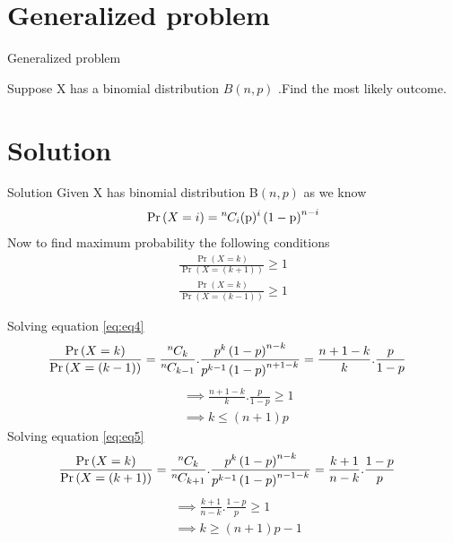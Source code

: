 \documentclass{beamer}
\providecommand{\pr}[1]{\ensuremath{\Pr\left(#1\right)}}
\providecommand{\brak}[1]{\ensuremath{\left(#1\right)}}
\newcommand*{\permcomb}[4][0mu]{{{}^{#3}\mkern#1#2_{#4}}}
\newcommand*{\comb}[1][-1mu]{\permcomb[#1]{C}}
\begin{document}
	\section{Generalized problem}
	\begin{frame}{Generalized problem}
	\begin{block}{}
	 Suppose X has a binomial distribution $B\brak{n,p}$ .Find the most likely outcome.
	\end{block}
	\end{frame}
	\section{Solution}	
	\begin{frame}{Solution}
		Given X has binomial distribution B\brak{n,p}
		as we know
		\begin{align}
		\pr{X = i} =\comb{n}{i}(\text{p})^i\left(1-\text{p}\right)^{n-i}
		\end{align}
		Now to find maximum probability the following conditions
		\begin{align}
		\frac{\pr{X=k}}{\pr{X=\brak{k+1}}}\ge 1 \label{eq:eq4}
		\\
		 \frac{\pr{X=k}}{\pr{X=\brak{k-1}}} \ge 1 \label{eq:eq5}
		\end{align}
	\end{frame}

	\begin{frame}{}
	Solving equation \eqref{eq:eq4}
	\begin{align} 
	    \frac{\pr{X=k}}{\pr{X=\brak{k-1}}} &=\frac{\comb{n}{k}}{\comb{n}{k-1}}.\frac{p^{k}\brak{1-p}^{n-k}}{p^{k-1}\brak{1-p}^{n+1-k}}=\frac{n+1-k}{k}.\frac{p}{1-p} 
	    \end{align}
	    \begin{align}
	  &\implies \frac{n+1-k}{k}.\frac{p}{1-p} \ge 1\\
	  &\implies k \le \brak{n+1}p
	    \end{align}
	    Solving equation \eqref{eq:eq5}
	\begin{align} 
	    \frac{\pr{X=k}}{\pr{X=\brak{k+1}}} &=\frac{\comb{n}{k}}{\comb{n}{k+1}}.\frac{p^{k}\brak{1-p}^{n-k}}{p^{k-1}\brak{1-p}^{n-1-k}}=\frac{k+1}{n-k}.\frac{1-p}{p} 
	    \end{align}
	    \begin{align}
	  &\implies \frac{k+1}{n-k}.\frac{1-p}{p} \ge 1\\
	  &\implies k \ge \brak{n+1}p-1
	    \end{align}
	    \end{frame}
\end{document}
